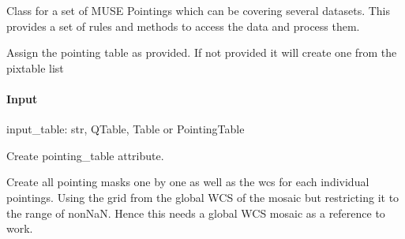 \documentclass[letterpaper,10pt,english]{sphinxmanual}
\begin{document}
\begin{fulllineitems}
\sphinxAtStartPar
Class for a set of MUSE Pointings which can be covering several
datasets. This provides a set of rules and methods to access the data and
process them.

\begin{fulllineitems}
\label{\detokenize{api/pymusepipe:pymusepipe.combine.MusePointings.assign_pointing_table}}
\pysigstartsignatures
{}
\pysigstopsignatures
\sphinxAtStartPar
Assign the pointing table as provided. If not provided it will create one from the
pixtable list


\paragraph{Input}
\label{\detokenize{api/pymusepipe:id39}}
\sphinxAtStartPar
input\_table: str, QTable, Table or PointingTable

\sphinxAtStartPar
Create pointing\_table attribute.

\end{fulllineitems}


\begin{fulllineitems}
\label{\detokenize{api/pymusepipe:pymusepipe.combine.MusePointings.create_all_pointings_wcs}}
\pysigstartsignatures
{}
\pysigstopsignatures
\sphinxAtStartPar
Create all pointing masks one by one
as well as the wcs for each individual pointings. Using the grid
from the global WCS of the mosaic but restricting it to the
range of non\sphinxhyphen{}NaN.
Hence this needs a global WCS mosaic as a reference to work.



\end{fulllineitems}
\end{fulllineitems}
\end{document}
